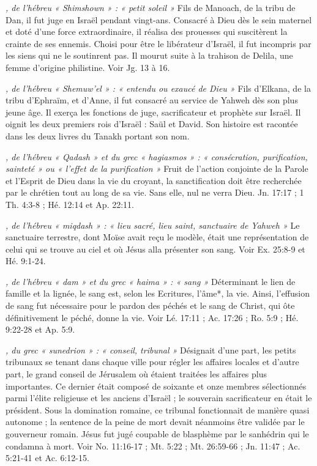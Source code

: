 \begin{multicols}{2}
\textit{, de l'hébreu « Shimshown » : « petit soleil »}\newline
Fils de Manoach, de la tribu de Dan, il fut juge en Israël pendant vingt-ans. Consacré à Dieu dès le sein maternel et doté d'une force extraordinaire, il réalisa des prouesses qui suscitèrent la crainte de ses ennemis. Choisi pour être le libérateur d'Israël, il fut incompris par les siens qui ne le soutinrent pas. Il mourut suite à la trahison de Delila, une femme d'origine philistine. Voir Jg. 13 à 16.

\textit{, de l'hébreu « Shemuw'el » : « entendu ou exaucé de Dieu »}\newline
Fils d'Elkana, de la tribu d'Ephraïm, et d'Anne, il fut consacré au service de Yahweh dès son plus jeune âge. Il exerça les fonctions de juge, sacrificateur et prophète sur Israël. Il oignit les deux premiers rois d'Israël : Saül et David. Son histoire est racontée dans les deux livres du Tanakh portant son nom.

\textit{, de l'hébreu « Qadash » et du grec « hagiasmos » : « consécration, purification, sainteté » ou « l'effet de la purification »}\newline
Fruit de l'action conjointe de la Parole et l'Esprit de Dieu dans la vie du croyant, la sanctification doit être recherchée par le chrétien tout au long de sa vie. Sans elle, nul ne verra Dieu. Jn. 17:17 ; 1 Th. 4:3-8 ; Hé. 12:14 et Ap. 22:11.

\textit{, de l'hébreu « miqdash » : « lieu sacré, lieu saint, sanctuaire de Yahweh »}\newline
Le sanctuaire terrestre, dont Moïse avait reçu le modèle, était une représentation de celui qui se trouve au ciel et où Jésus alla présenter son sang. Voir Ex. 25:8-9 et Hé. 9:1-24.

\textit{, de l'hébreu « dam » et du grec « haima » : « sang »}\newline
Déterminant le lien de famille et la lignée, le sang est, selon les Ecritures, l'âme*, la vie. Ainsi, l'effusion de sang fut nécessaire pour le pardon des péchés et le sang de Christ, qui ôte définitivement le péché, donne la vie. Voir Lé. 17:11 ; Ac. 17:26 ; Ro. 5:9 ; Hé. 9:22-28 et Ap. 5:9.

\textit{, du grec « sunedrion » : « conseil, tribunal »}\newline
Désignait d'une part, les petits tribunaux se tenant dans chaque ville pour régler les affaires locales et d'autre part, le grand conseil de Jérusalem où étaient traitées les affaires plus importantes. Ce dernier était composé de soixante et onze membres sélectionnés parmi l'élite religieuse et les anciens d'Israël ; le souverain sacrificateur en était le président. Sous la domination romaine, ce tribunal fonctionnait de manière quasi autonome ; la sentence de la peine de mort devait néanmoins être validée par le gouverneur romain. Jésus fut jugé coupable de blasphème par le sanhédrin qui le condamna à mort. Voir No. 11:16-17 ; Mt. 5:22 ; Mt. 26:59-66 ; Jn. 11:47 ; Ac. 5:21-41 et Ac. 6:12-15.


\end{multicols}
